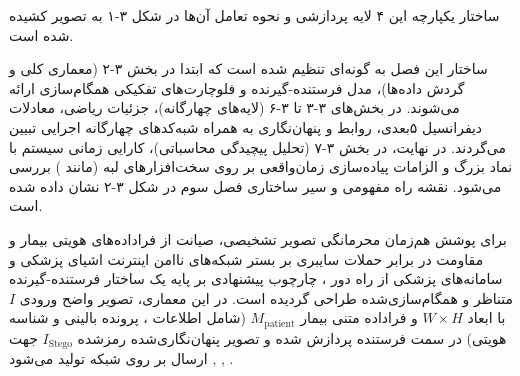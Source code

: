 

ساختار یکپارچه این ۴ لایه پردازشی و نحوه تعامل آن‌ها در شکل ۳{-}۱ به تصویر کشیده شده است.\par






ساختار این فصل به گونه‌ای تنظیم شده است که ابتدا در بخش ۳{-}۲ (معماری کلی و گردش داده‌ها)، مدل فرستنده{-}گیرنده و فلوچارت‌های تفکیکی همگام‌سازی ارائه می‌شوند. در بخش‌های ۳{-}۳ تا ۳{-}۶ (لایه‌های چهارگانه)، جزئیات ریاضی، معادلات دیفرانسیل ۵بعدی، روابط  و پنهان‌نگاری به همراه شبه‌کدهای چهارگانه اجرایی تبیین می‌گردند. در نهایت، در بخش ۳{-}۷ (تحلیل پیچیدگی محاسباتی)، کارایی زمانی سیستم با نماد بزرگ و الزامات پیاده‌سازی زمان‌واقعی  بر روی سخت‌افزارهای لبه  (مانند ) بررسی می‌شود. نقشه راه مفهومی و سیر ساختاری فصل سوم در شکل ۳{-}۲ نشان داده شده است.\par






برای پوشش هم‌زمان محرمانگی تصویر تشخیصی، صیانت از فراداده‌های هویتی بیمار و مقاومت در برابر حملات سایبری بر بستر شبکه‌های ناامن اینترنت اشیای پزشکی  و سامانه‌های پزشکی از راه دور ، چارچوب پیشنهادی بر پایه یک ساختار فرستنده{-}گیرنده متناظر و همگام‌سازی‌شده طراحی گردیده است. در این معماری، تصویر واضح ورودی $I$ با ابعاد $W \times H$ و فراداده متنی بیمار $M_{\mathrm{patient}}$ (شامل اطلاعات ، پرونده بالینی و شناسه هویتی) در سمت فرستنده پردازش شده و تصویر پنهان‌نگاری‌شده رمزشده $I_{\mathrm{Stego}}$ جهت ارسال بر روی شبکه تولید می‌شود , , .\par

